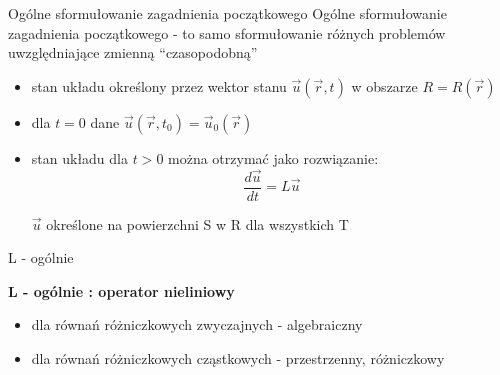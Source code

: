 \begin{frame}{Ogólne sformułowanie zagadnienia początkowego}
  Ogólne sformułowanie zagadnienia początkowego - to samo sformułowanie różnych problemów uwzględniające zmienną ``czasopodobną'' 
  \begin{itemize}
    \item stan układu określony przez wektor stanu $\vec{u}(\vec{r},t)$ w obszarze $R = R(\vec{r})$
    \item dla $ t = 0 $ dane $\vec{u}(\vec{r},t_0) = \vec{u}_0(\vec{r})$
    \item stan układu dla $ t > 0$ można otrzymać jako rozwiązanie:
    $$\frac{d\vec{u}}{dt} = L\vec{u}$$ \par
    \begin{center}
    	$\vec{u}$ określone na powierzchni S w R dla wszystkich T
    \end{center}
  \end{itemize}
  
\end{frame}
\begin{frame}{L - ogólnie}
\begin{block}{\textbf{L - ogólnie : operator nieliniowy}}
	\begin{itemize}
    	\item dla równań różniczkowych zwyczajnych - algebraiczny
    	\item dla równań różniczkowych cząstkowych - przestrzenny, różniczkowy
 	\end{itemize}
\end{block}
	
  
\end{frame}